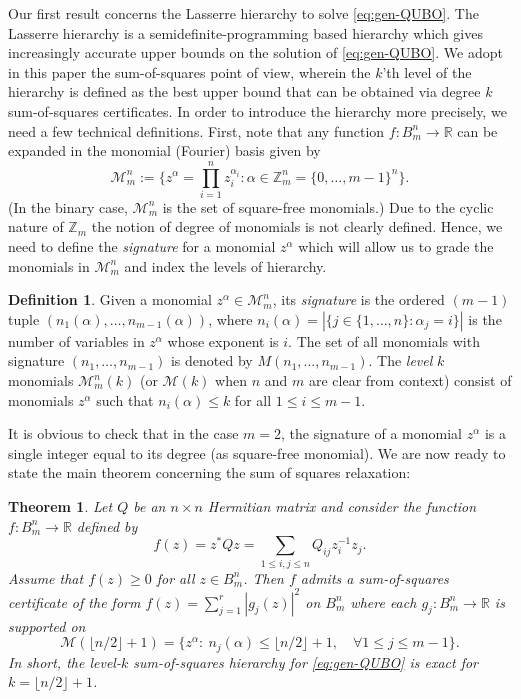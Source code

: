 \documentclass{article}
\newcommand{\ZZ}{\mathbb{Z}}
\newcommand{\RR}{\mathbb{R}}
\newtheorem{theorem}{Theorem}
\theoremstyle{definition}
\newtheorem{definition}{Definition}
\newcommand{\Mon}{\mathcal{M}}
\newcommand{\kMon}[1]{\mathcal{M}(#1)}
\begin{document}
Our first result concerns the Lasserre hierarchy to solve \eqref{eq:gen-QUBO}. The Lasserre hierarchy is a semidefinite-programming based hierarchy which gives increasingly accurate upper bounds on the solution of \eqref{eq:gen-QUBO}. We adopt in this paper the sum-of-squares point of view, wherein the $k$'th level of the hierarchy is defined as the best upper bound that can be obtained via degree $k$ sum-of-squares certificates. In order to introduce the hierarchy more precisely, we need a few technical definitions. First, note that any function $f:B_m^n \to \RR$ can be expanded in the monomial (Fourier) basis given by
\begin{equation*}
     \Mon^n_m:= \{z^\alpha = \prod_{i=1}^n z_i^{\alpha_i}:  \alpha \in \ZZ^n_m = \{0,\dots,m-1\}^n\}.
\end{equation*}
(In the binary case, $\Mon^n_m$ is the set of square-free monomials.) Due to the cyclic nature of $\ZZ_m$ the notion of degree of monomials is not clearly defined. Hence, we need to define the \emph{signature} for a monomial $z^\alpha$ which will allow us to grade the monomials in $\Mon^n_m$ and index the levels of hierarchy.
\begin{definition}\label{def:signature-intro}
    Given a monomial $z^\alpha\in \Mon^n_m$, its \emph{signature} is the ordered $(m-1)$ tuple $(n_1(\alpha),\ldots,n_{m-1}(\alpha))$, where $n_i(\alpha)=|\{j \in \{1,\ldots,n\}:\alpha_j=i\}|$ is the number of variables in $z^\alpha$ whose exponent is $i$. The set of all monomials with signature $(n_1,\ldots,n_{m-1})$ is denoted by $M(n_1,\ldots,n_{m-1})$. The \emph{level} $k$ monomials $\Mon^n_m(k)$ (or $\kMon{k}$ when $n$ and $m$ are clear from context) consist of monomials $z^\alpha$ such that $n_i(\alpha)\le k$ for all $1\le i\le m-1$. 
\end{definition}
It is obvious to check that in the case $m=2$, the signature of a monomial $z^\alpha$ is a single integer equal to its degree (as square-free monomial).
We are now ready to state the main theorem concerning the sum of squares relaxation:
\begin{theorem}\label{thm:main-intro}
Let $Q$ be an $n\times n$ Hermitian matrix and consider the function $f:B_m^n \to \RR$ defined by
\begin{equation}
    \label{eq:quadf}
    f(z) = z^* Q z = \sum_{1\leq i,j \leq n} Q_{ij} z_i^{-1} z_j.
\end{equation}
Assume that $f(z) \geq 0$ for all $z \in B_m^n$. Then $f$ admits a sum-of-squares certificate of the form $f(z)=\sum_{j=1}^r |g_j(z)|^2$ on $B_m^n$ where each $g_j:B_m^n\to \RR$ is supported on
\begin{equation}
    \label{eq:monoms-main-thm}
    \kMon{\lfloor n/2\rfloor +1} =\{z^\alpha:~ n_j(\alpha)\le \lfloor n/2\rfloor+1,\quad \forall 1\le j\le m-1\}.
\end{equation}
In short, the level-$k$ sum-of-squares hierarchy for \eqref{eq:gen-QUBO} is exact for $k = \lfloor n/2\rfloor +1$. 
\end{theorem}
\end{document}
